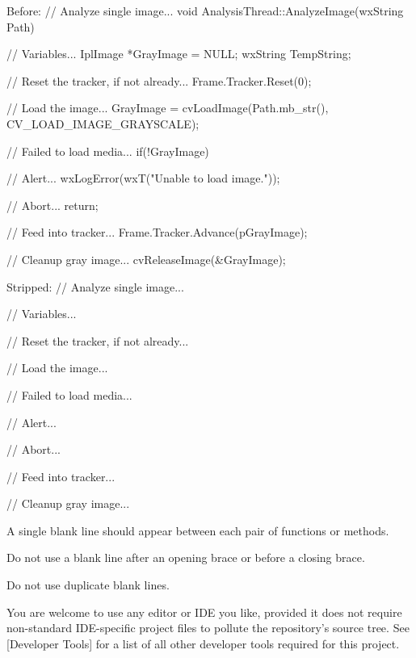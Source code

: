 Before:
\startCodeExample
\starttyping
// Analyze single image...
void AnalysisThread::AnalyzeImage(wxString Path)
{
    // Variables...
    IplImage   *GrayImage   = NULL;
    wxString    TempString;

    // Reset the tracker, if not already...
    Frame.Tracker.Reset(0);

    // Load the image...
    GrayImage = cvLoadImage(Path.mb_str(), CV_LOAD_IMAGE_GRAYSCALE);

        // Failed to load media...
        if(!GrayImage)
        {
            // Alert...
            wxLogError(wxT("Unable to load image."));
            
            // Abort...
            return;
        }

    // Feed into tracker...
    Frame.Tracker.Advance(pGrayImage);
    
    // Cleanup gray image...
    cvReleaseImage(&GrayImage);
}
\stoptyping
\stopCodeExample

Stripped:
\startCodeExample
\starttyping
// Analyze single image...

    // Variables...

    // Reset the tracker, if not already...

    // Load the image...

        // Failed to load media...

            // Alert...

            // Abort...

    // Feed into tracker...
    
    // Cleanup gray image...
\stoptyping
\stopCodeExample

\item
A single blank line should appear between each pair of functions or methods. 

\item
Do not use a blank line after an opening brace or before a closing brace.

\item
Do not use duplicate blank lines.
\stopitemize


You are welcome to use any editor or IDE you like, provided it does not require non-standard IDE-specific project files to pollute the repository's source tree. See [Developer Tools] for a list of all other developer tools required for this project.

